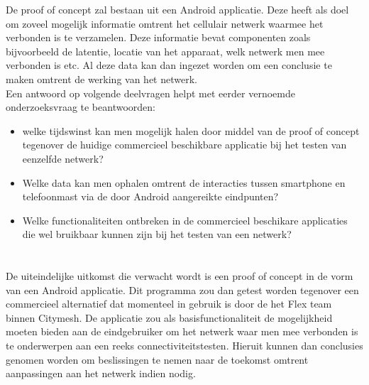 De proof of concept zal bestaan uit een Android applicatie. Deze heeft als doel om zoveel mogelijk informatie omtrent het cellulair netwerk waarmee het verbonden is te verzamelen. Deze informatie bevat componenten zoals bijvoorbeeld de latentie, locatie van het apparaat, welk netwerk men mee verbonden is etc. Al deze data kan dan ingezet worden om een conclusie te maken omtrent de werking van het netwerk. \\

Een antwoord op volgende deelvragen helpt met eerder vernoemde onderzoeksvraag te beantwoorden:

\begin{itemize}
    \item welke tijdswinst kan men mogelijk halen door middel van de proof of concept tegenover de huidige commercieel beschikbare applicatie bij het testen van eenzelfde netwerk?
    \item Welke data kan men ophalen omtrent de interacties tussen smartphone en telefoonmast via de door Android aangereikte eindpunten?
    \item Welke functionaliteiten ontbreken in de commercieel beschikare applicaties die wel bruikbaar kunnen zijn bij het testen van een netwerk?
\end{itemize}

\section{}%
\label{sec:onderzoeksdoelstelling}


De uiteindelijke uitkomst die verwacht wordt is een proof of concept in de vorm van een Android applicatie. Dit programma zou dan getest worden tegenover een commercieel alternatief dat momenteel in gebruik is door de het Flex team binnen Citymesh. De applicatie zou als basisfunctionaliteit de mogelijkheid moeten bieden aan de eindgebruiker om het netwerk waar men mee verbonden is te onderwerpen aan een reeks connectiviteitstesten. Hieruit kunnen dan conclusies genomen worden om beslissingen te nemen naar de toekomst omtrent aanpassingen aan het netwerk indien nodig.

\section{}%
\label{sec:opzet-bachelorproef}

